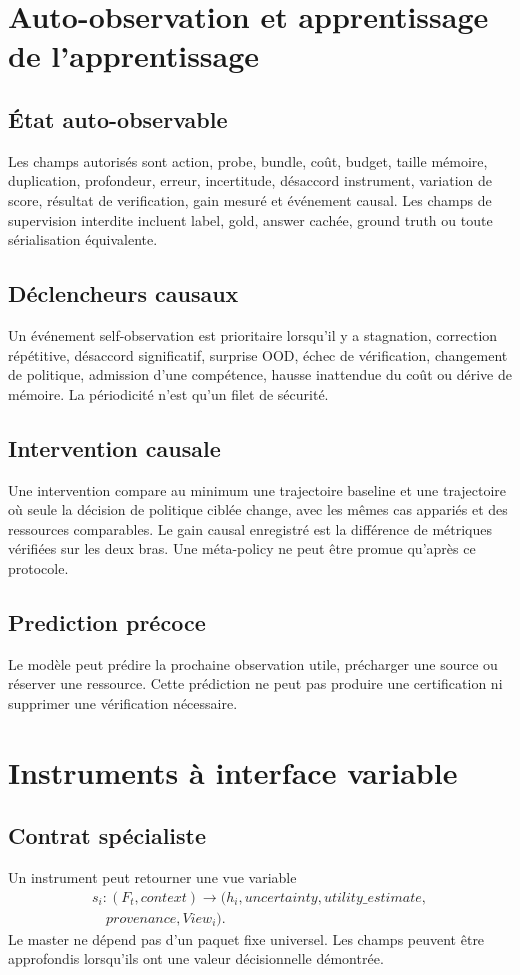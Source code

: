 \documentclass[11pt,a4paper]{report}
\begin{document}
\chapter{Auto-observation et apprentissage de l'apprentissage}
\section{État auto-observable}
Les champs autorisés sont action, probe, bundle, coût, budget, taille mémoire, duplication, profondeur, erreur, incertitude, désaccord instrument, variation de score, résultat de verification, gain mesuré et événement causal. Les champs de supervision interdite incluent label, gold, answer cachée, ground truth ou toute sérialisation équivalente.

\section{Déclencheurs causaux}
Un événement self-observation est prioritaire lorsqu'il y a stagnation, correction répétitive, désaccord significatif, surprise OOD, échec de vérification, changement de politique, admission d'une compétence, hausse inattendue du coût ou dérive de mémoire. La périodicité n'est qu'un filet de sécurité.

\section{Intervention causale}
Une intervention compare au minimum une trajectoire baseline et une trajectoire où seule la décision de politique ciblée change, avec les mêmes cas appariés et des ressources comparables. Le gain causal enregistré est la différence de métriques vérifiées sur les deux bras. Une méta-policy ne peut être promue qu'après ce protocole.

\section{Prediction précoce}
Le modèle peut prédire la prochaine observation utile, précharger une source ou réserver une ressource. Cette prédiction ne peut pas produire une certification ni supprimer une vérification nécessaire.

\chapter{Instruments à interface variable}
\section{Contrat spécialiste}
Un instrument peut retourner une vue variable
\[
\begin{aligned}
s_i:(F_t,context)\to(h_i,uncertainty,utility\_estimate,\\
\quad provenance,View_i).
\end{aligned}
\]
Le master ne dépend pas d'un paquet fixe universel. Les champs peuvent être approfondis lorsqu'ils ont une valeur décisionnelle démontrée.
\end{document}

